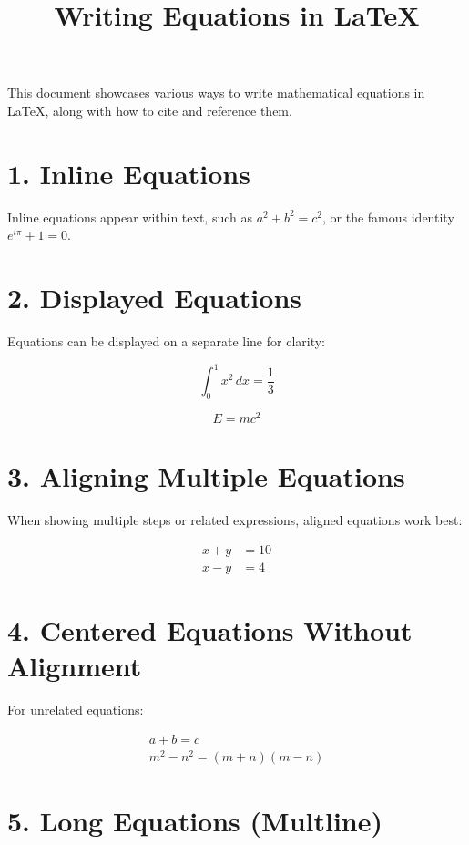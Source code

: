 \documentclass[12pt]{article}
\title{Writing Equations in \LaTeX}
\author{}
\date{}
\begin{document}
\maketitle

This document showcases various ways to write mathematical equations in \LaTeX, along with how to cite and reference them.

\section*{1. Inline Equations}

Inline equations appear within text, such as \( a^2 + b^2 = c^2 \), or the famous identity \( e^{i\pi} + 1 = 0 \).

\section*{2. Displayed Equations}

Equations can be displayed on a separate line for clarity:

\[
\int_0^1 x^2 \, dx = \frac{1}{3}
\]

\begin{equation}
E = mc^2
\end{equation}

\section*{3. Aligning Multiple Equations}

When showing multiple steps or related expressions, aligned equations work best:

\begin{align}
x + y &= 10 \\
x - y &= 4
\end{align}

\section*{4. Centered Equations Without Alignment}

For unrelated equations:

\begin{gather}
a + b = c \\
m^2 - n^2 = (m+n)(m-n)
\end{gather}

\section*{5. Long Equations (Multline)}
\end{document}
